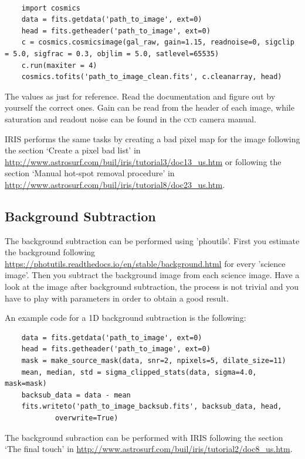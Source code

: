 \documentclass[a4paper, 11pt, fleqn]{memoir}
\begin{document}
\paragraph{}
\begin{verbatim}
    import cosmics
    data = fits.getdata('path_to_image', ext=0)
    head = fits.getheader('path_to_image', ext=0)
    c = cosmics.cosmicsimage(gal_raw, gain=1.15, readnoise=0, sigclip = 5.0, sigfrac = 0.3, objlim = 5.0, satlevel=65535)
    c.run(maxiter = 4)
    cosmics.tofits('path_to_image_clean.fits', c.cleanarray, head)
\end{verbatim}
The values as just for reference.
Read the documentation and figure out by yourself the correct ones.
Gain can be read from the header of each image, while saturation and readout noise can be found in the \textsc{ccd} camera manual.

IRIS performs the same tasks by creating a bad pixel map for the image following the section `Create a pixel bad list' in \url{http://www.astrosurf.com/buil/iris/tutorial3/doc13_us.htm} or following the section `Manual hot-spot removal procedure' in \url{http://www.astrosurf.com/buil/iris/tutorial8/doc23_us.htm}.

\subsection{Background Subtraction}

The background subtraction can be performed using 'phoutils'.
First you estimate the background following \url{https://photutils.readthedocs.io/en/stable/background.html} for every 'science image'.
Then you subtract the background image from each science image.
Have a look at the image after background subtraction, the process is not trivial and you have to play with parameters in order to obtain a good result.

An example code for a 1D background subtraction is the following:
\begin{verbatim}
    data = fits.getdata('path_to_image', ext=0)
    head = fits.getheader('path_to_image', ext=0)
    mask = make_source_mask(data, snr=2, npixels=5, dilate_size=11)
    mean, median, std = sigma_clipped_stats(data, sigma=4.0, mask=mask)
    backsub_data = data - mean
    fits.writeto('path_to_image_backsub.fits', backsub_data, head, 
    		overwrite=True)
\end{verbatim}

The background subraction can be performed with IRIS following the section `The final touch' in \url{http://www.astrosurf.com/buil/iris/tutorial2/doc8_us.htm}.
\end{document}
